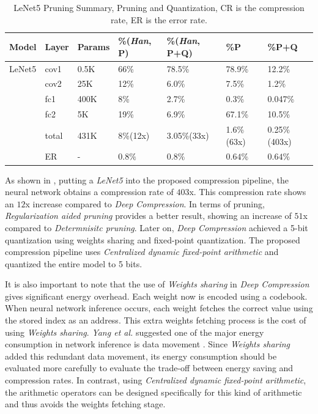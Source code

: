 \documentclass[a4paper,12pt]{report}
\begin{document}
\begin{table}[!h]
  \centering
  \begin{tabular}{lllllll}
    \hline
    Model   &Layer     &Params    &\%(\textit{Han}, P)  &\%(\textit{Han}, P+Q)  &\%P        &\%P+Q 	\\
    \hline
    LeNet5  &cov1     &0.5K       &66\%                 &78.5\%                 &78.9\%     &12.2\%\\
            &cov2     &25K        &12\%                 &6.0\%                  &7.5\%      &1.2\%\\
            &fc1      &400K       &8\%                  &2.7\%                  &0.3\%      &0.047\%\\
            &fc2      &5K         &19\%                 &6.9\%                  &67.1\%     &10.5\%\\
    \hline
            &total    &431K       &8\%(12x)             &3.05\%(33x)            &1.6\%(63x) &0.25\%(403x)\\
    \hline
            &ER       &-          &$0.8\%$               &$0.8\%$               &$0.64\%$   &$0.64\%$\\
    \hline
  \end{tabular}
  \caption{LeNet5 Pruning Summary, Pruning and Quantization, CR is the compression
  rate, ER is the error rate.}
  \label{tab:comp_summary}
\end{table}

As shown in , putting a \textit{LeNet5} into the proposed
compression pipeline, the neural network obtains a compression rate of $403$x.
This compression rate shows an $12$x increase compared to \textit{Deep Compression}.
In terms of pruning, \textit{Regularization aided pruning} provides a better result,
showing an increase of $51$x compared to \textit{Determnisitc pruning}.
Later on, \textit{Deep Compression} achieved a 5-bit quantization using
 weights sharing and fixed-point quantization.
The proposed compression pipeline uses \textit{Centralized dynamic fixed-point
arithmetic} and quantized the entire model to 5 bits.

It is also important to note that the use of \textit{Weights sharing} in
\textit{Deep Compression} gives significant energy overhead.
Each weight now is encoded using a codebook.
When neural network inference occurs, each weight fetches the correct value
using the stored index as an address.
This extra weights fetching process is the cost of using \textit{Weights sharing}.
\textit{Yang et al.} suggested one of the major energy consumption in network
inference is data movement \cite{Tien}.
Since \textit{Weights sharing} added this redundant data movement, its energy
consumption should be evaluated more carefully to evaluate the trade-off between
energy saving and compression rates.
In contrast, using \textit{Centralized dynamic fixed-point
arithmetic}, the arithmetic operators can be designed specifically for this kind
of arithmetic and thus avoids the weights fetching stage.
\end{document}
